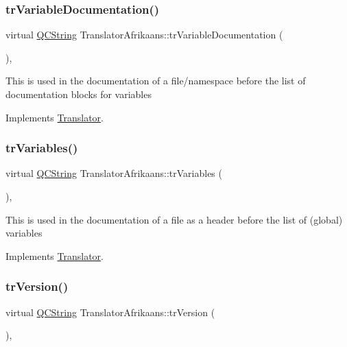 \subsubsection{\texorpdfstring{trVariableDocumentation()}{trVariableDocumentation()}}
{\footnotesize\ttfamily virtual \mbox{\hyperlink{class_q_c_string}{Q\+C\+String}} Translator\+Afrikaans\+::tr\+Variable\+Documentation (\begin{DoxyParamCaption}{ }\end{DoxyParamCaption})\hspace{0.3cm}{\ttfamily [inline]}, {\ttfamily [virtual]}}

This is used in the documentation of a file/namespace before the list of documentation blocks for variables 

Implements \mbox{\hyperlink{class_translator}{Translator}}.

\mbox{\label{class_translator_afrikaans_a615f59174dc2cc723db2fb648bb11cca}} 
\subsubsection{\texorpdfstring{trVariables()}{trVariables()}}
{\footnotesize\ttfamily virtual \mbox{\hyperlink{class_q_c_string}{Q\+C\+String}} Translator\+Afrikaans\+::tr\+Variables (\begin{DoxyParamCaption}{ }\end{DoxyParamCaption})\hspace{0.3cm}{\ttfamily [inline]}, {\ttfamily [virtual]}}

This is used in the documentation of a file as a header before the list of (global) variables 

Implements \mbox{\hyperlink{class_translator}{Translator}}.

\mbox{\label{class_translator_afrikaans_a338169663d1e450f3d656c28609450d6}} 
\subsubsection{\texorpdfstring{trVersion()}{trVersion()}}
{\footnotesize\ttfamily virtual \mbox{\hyperlink{class_q_c_string}{Q\+C\+String}} Translator\+Afrikaans\+::tr\+Version (\begin{DoxyParamCaption}{ }\end{DoxyParamCaption})\hspace{0.3cm}{\ttfamily [inline]}, {\ttfamily [virtual]}}

